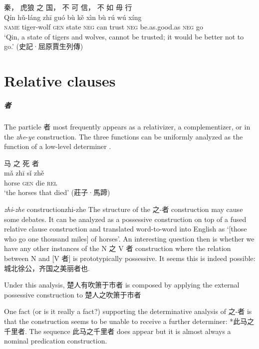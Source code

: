 \documentclass[UTF8, a4paper, oneside, scheme=plain, 12pt]{ctexrep}
\newcommand{\form}[1]{\emph{#1}}
\newcommand{\translate}[1]{`#1'}
\newcommand*{\category}[1]{\textsc{#1}}
\begin{document}
\begin{exe}
    \ex
    \glll 秦， 虎狼 之 国， 不 可 信， 不 如 毋 行 \\
    Qín hǔ-láng zhī guó bù kě xìn bù rú wú xíng \\
    \category{name} tiger-wolf \category{gen} state \category{neg} can trust \category{neg} be.as.good.as \category{neg} go \\
    \glt\translate{Qin, a state of tigers and wolves, cannot be trusted; it would be better not to go.} \hfill (史記·屈原賈生列傳)
\end{exe}

\chapter{Relative clauses}

\paragraph*{者} The particle 者 most frequently appears as a relativizer, a complementizer,
or in the \form{zhe}-\form{ye} construction.
The three functions can be uniformly analyzed as the function of a low-level determiner \citep{aldridge2009old}. 

\begin{exe}
    \ex\label{ex:grammatical.np.template.gen.2}
    \glll 马 之 死 者 \\
    mǎ zhī sǐ zhě \\
    horse \category{gen} die \category{rel} \\
    \glt\translate{the horses that died} \hfill (莊子·馬蹄)
\end{exe}

\begin{todobox}{\form{zhi}-\form{zhe} construction}{zhi-zhe}
    The structure of the 之-者 construction may cause some debates.
    It can be analyzed as a possessive construction on top of a fused relative clause construction
    and translated word-to-word into English as 
    \translate{[those who go one thousand miles] of horses}.
    An interesting question then is whether we have any other instances of the N 之 V 者 construction
    where the relation between N and [V 者] is prototypically possessive.
    It seems this is indeed possible: 城北徐公，齐国之美丽者也.
    
    Under this analysis, 楚人有吹箫于市者 is composed by applying the external possessive construction
    to 楚人之吹箫于市者

    One fact (or is it really a fact?) supporting the determinative analysis of 之-者
    is that the construction seems to be unable to receive a further determiner:
    *此马之千里者.
    The sequence 此马之千里者 does appear but it is almost always a nominal predication construction.
\end{todobox}
\end{document}
